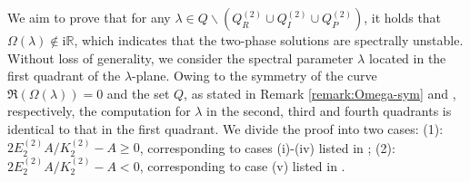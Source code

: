 \documentclass[11pt,reqno]{amsart}
\newcommand{\ii}{\mathrm{i}}
\numberwithin{equation}{section}
\begin{document}
\newenvironment{proof-spec-cn}{\emph{Proof of \Cref{theorem:spectral-complex}.}}{\hfill$\Box$\medskip}
\begin{proof-spec-cn}
	We aim to prove that for any $\lambda \in Q \backslash ( Q^{(2)} _R \cup  Q^{(2)} _I \cup  Q^{(2)} _P)$, it holds that $\Omega(\lambda) \notin \ii  \mathbb{R}$, which indicates that the two-phase solutions are spectrally unstable.
	Without loss of generality, we consider the spectral parameter $\lambda$ located in the first quadrant of the $\lambda$-plane. 
	Owing to the symmetry of the curve ${\Re}(\Omega(\lambda))=0$ and the set $Q$, as stated in Remark \ref{remark:Omega-sym} and , respectively, the computation for $\lambda$ in the second, third and fourth quadrants is identical to that in the first quadrant.
	 We divide the proof into two cases:
    (1): $2E^{(2)}_2A/K^{(2)}_2-A \ge 0$, corresponding to cases (i)-(iv) listed in ;
	(2): $2E^{(2)}_2A/K^{(2)}_2-A<0$, corresponding to case (v) listed in .
	
	
	

\end{proof-spec-cn}
\end{document}
